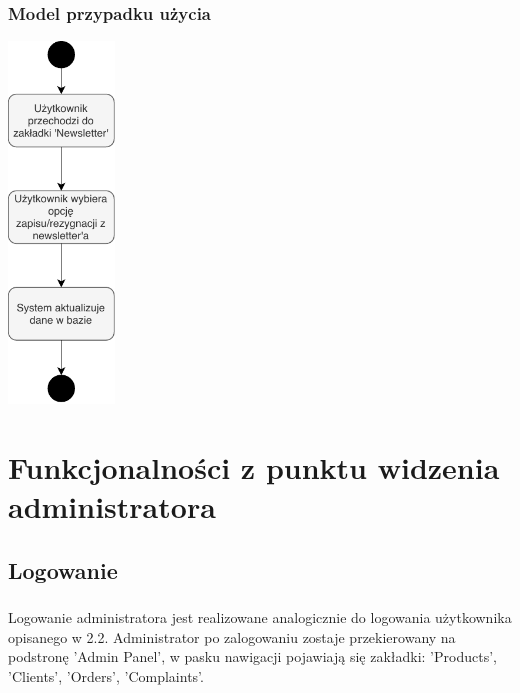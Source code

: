 \documentclass[10pt]{report}
\begin{document}
			\subsection{Model przypadku użycia}
			\begin{center}
				\includegraphics[width=80pt]{newsletter.pdf}
			\end{center}
			
			
	
\chapter{Funkcjonalności z punktu widzenia administratora}
	
	
	\section{Logowanie}
			\paragraph{} Logowanie administratora jest realizowane analogicznie do logowania użytkownika opisanego w 2.2. Administrator po zalogowaniu zostaje przekierowany na podstronę 'Admin Panel', w pasku nawigacji pojawiają się zakładki: 'Products', 'Clients', 'Orders', 'Complaints'.
		
\end{document}
